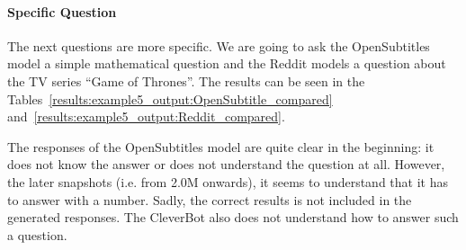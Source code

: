\paragraph{Specific Question}
The next questions are more specific. We are going to ask the OpenSubtitles model a simple mathematical question and the Reddit models a question about the TV series ``Game of Thrones''. The results can be seen in the Tables~\ref{results:example5_output:OpenSubtitle_compared} and~\ref{results:example5_output:Reddit_compared}.

The responses of the OpenSubtitles model are quite clear in the beginning: it does not know the answer or does not understand the question at all. However, the later snapshots (i.e. from 2.0M onwards), it seems to understand that it has to answer with a number. Sadly, the correct results is not included in the generated responses. The CleverBot also does not understand how to answer such a question.

